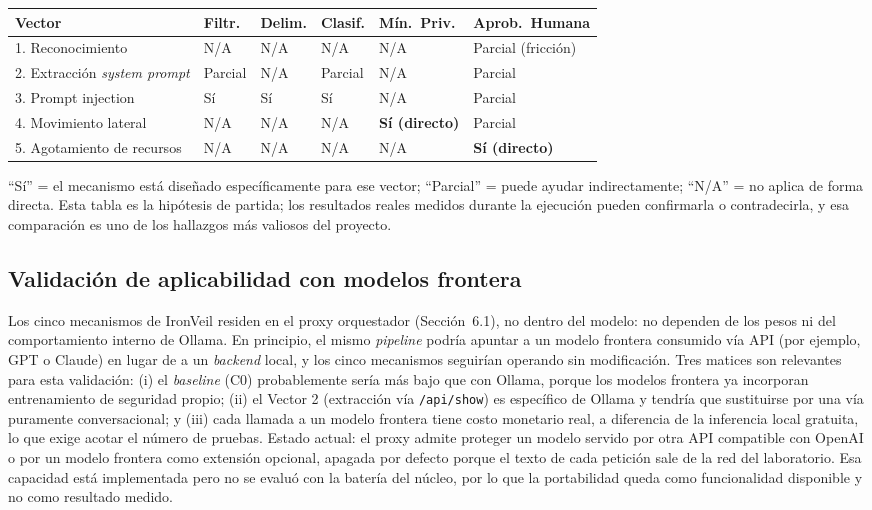\documentclass[11pt,letterpaper]{article}
\begin{document}
\begin{center}
\small
\begin{tabular}{@{}p{3.6cm}p{1.5cm}p{1.9cm}p{2.0cm}p{2.2cm}p{2.3cm}@{}}
\toprule
\textbf{Vector} & \textbf{Filtr.} & \textbf{Delim.} & \textbf{Clasif.} & \textbf{Mín.\ Priv.} & \textbf{Aprob.\ Humana} \\
\midrule
1. Reconocimiento & N/A & N/A & N/A & N/A & Parcial (fricción) \\
2. Extracción \emph{system prompt} & Parcial & N/A & Parcial & N/A & Parcial \\
3. Prompt injection & Sí & Sí & Sí & N/A & Parcial \\
4. Movimiento lateral & N/A & N/A & N/A & \textbf{Sí (directo)} & Parcial \\
5. Agotamiento de recursos & N/A & N/A & N/A & N/A & \textbf{Sí (directo)} \\
\bottomrule
\end{tabular}
\end{center}
\vspace{0.3em}
{\footnotesize ``Sí'' = el mecanismo está diseñado específicamente para ese vector; ``Parcial'' = puede ayudar indirectamente; ``N/A'' = no aplica de forma directa. Esta tabla es la hipótesis de partida; los resultados reales medidos durante la ejecución pueden confirmarla o contradecirla, y esa comparación es uno de los hallazgos más valiosos del proyecto.}

\subsection{Validación de aplicabilidad con modelos frontera}
\label{sec:extensiones}

Los cinco mecanismos de IronVeil residen en el proxy orquestador (Sección~6.1), no dentro del modelo: no dependen de los pesos ni del comportamiento interno de Ollama. En principio, el mismo \emph{pipeline} podría apuntar a un modelo frontera consumido vía API (por ejemplo, GPT o Claude) en lugar de a un \emph{backend} local, y los cinco mecanismos seguirían operando sin modificación. Tres matices son relevantes para esta validación: (i) el \emph{baseline} (C0) probablemente sería más bajo que con Ollama, porque los modelos frontera ya incorporan entrenamiento de seguridad propio; (ii) el Vector 2 (extracción vía \texttt{/api/show}) es específico de Ollama y tendría que sustituirse por una vía puramente conversacional; y (iii) cada llamada a un modelo frontera tiene costo monetario real, a diferencia de la inferencia local gratuita, lo que exige acotar el número de pruebas. Estado actual: el proxy admite proteger un modelo servido por otra API compatible con OpenAI o por un modelo frontera como extensión opcional, apagada por defecto porque el texto de cada petición sale de la red del laboratorio. Esa capacidad está implementada pero no se evaluó con la batería del núcleo, por lo que la portabilidad queda como funcionalidad disponible y no como resultado medido.
\end{document}
